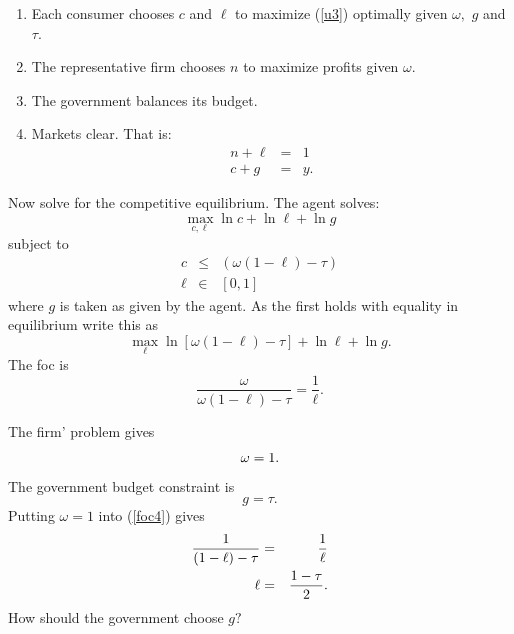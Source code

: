 \documentclass{sebase}
\begin{document}
\begin{enumerate}
\item Each consumer chooses $c$ and $\ell $ to maximize (\ref{u3}) optimally
given $\omega ,$ $g$ and $\tau $.

\item The representative firm chooses $n$ to maximize profits given $\omega
. $

\item The government balances its budget.

\item Markets clear. That is:%
\begin{eqnarray*}
n+\ell &=&1 \\
c+g &=&y.
\end{eqnarray*}
\end{enumerate}

\pagebreak

Now solve for the competitive equilibrium. The agent solves:%
\begin{equation*}
\underset{c,\ell }{\max }\ln c+\ln \ell +\ln g
\end{equation*}%
subject to%
\begin{eqnarray*}
c &\leq &\left( \omega \left( 1-\ell \right) -\tau \right) \\
\ell &\in &\left[ 0,1\right]
\end{eqnarray*}%
where $g$ is taken as given by the agent. As the first holds with equality
in equilibrium write this as 
\begin{equation*}
\underset{\ell }{\max }\ln \left[ \omega \left( 1-\ell \right) -\tau \right]
+\ln \ell +\ln g.
\end{equation*}%
The foc is 
\begin{equation}
\frac{\omega }{\omega \left( 1-\ell \right) -\tau }=\frac{1}{\ell }.
\label{foc4}
\end{equation}%
\pagebreak

The firm' problem gives 
\begin{equation}
\omega =1.  \notag
\end{equation}%
The government budget constraint is%
\begin{equation}
g=\tau .  \label{bc}
\end{equation}%
Putting $\omega =1$ into (\ref{foc4}) gives 
\begin{eqnarray}
\frac{1}{\left( 1-\ell \right) -\tau } &=&\frac{1}{\ell }  \label{foc5} \\
\ell &=&\frac{1-\tau }{2}.  \notag
\end{eqnarray}%
$\allowbreak $How should the government choose $g?$ \pagebreak
\end{document}
